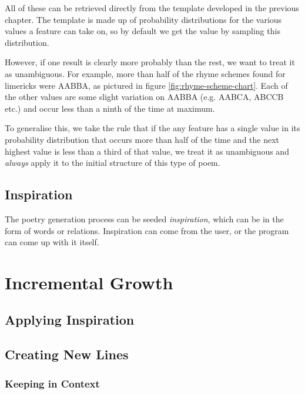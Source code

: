 All of these can be retrieved directly from the template developed in the previous chapter. The template is made up of probability distributions for the various values a feature can take on, so by default we get the value by sampling this distribution. 

However, if one result is clearly more probably than the rest, we want to treat it as unambiguous. For example, more than half of the rhyme schemes found for limericks were AABBA, as pictured in figure \ref{fig:rhyme-scheme-chart}. Each of the other values are some slight variation on AABBA (e.g. AABCA, ABCCB etc.) and occur less than a ninth of the time at maximum.

To generalise this, we take the rule that if the any feature has a single value in its probability distribution that occurs more than half of the time and the next highest value is less than a third of that value, we treat it as unambiguous and \textit{always} apply it to the initial structure of this type of poem.


\subsection{Inspiration}
The poetry generation process can be seeded \textit{inspiration}, which can be in the form of words or relations. Inspiration can come from the user, or the program can come up with it itself.


\section{Incremental Growth}

\subsection{Applying Inspiration}


\subsection{Creating New Lines}
\label{sec:new-lines}
\subsubsection{Keeping in Context}
